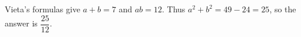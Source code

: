 Vieta's formulas give $a+b=7$ and $ab=12$. Thus $a^2+b^2=49-24=25$, so the answer is $\boxed{\dfrac{25}{12}}$.
